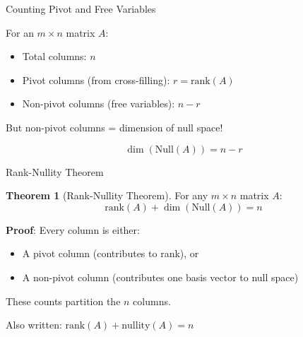 \documentclass[10pt]{beamer}
\theoremstyle{definition}
\newtheorem{thm}{Theorem}[section]
\newcommand{\x}[1]{\alert{\textbf{#1}}}
\begin{document}
\begin{frame}{Counting Pivot and Free Variables}

For an $m \times n$ matrix $A$:

\vspace{1em}

\begin{itemize}
\item Total columns: $n$
\item Pivot columns (from cross-filling): $r = \text{rank}(A)$
\item Non-pivot columns (free variables): $n - r$
\end{itemize}

\vspace{1em}

But non-pivot columns = dimension of null space!

\vspace{1em}

$$\dim(\text{Null}(A)) = n - r$$

\end{frame}

\begin{frame}{Rank-Nullity Theorem}

\begin{thm}[Rank-Nullity Theorem]
For any $m \times n$ matrix $A$:
$$\boxed{\text{rank}(A) + \dim(\text{Null}(A)) = n}$$
\end{thm}

\vspace{1em}

\x{Proof}: Every column is either:
\begin{itemize}
\item A pivot column (contributes to rank), or
\item A non-pivot column (contributes one basis vector to null space)
\end{itemize}

These counts partition the $n$ columns.

\vspace{1em}

Also written: $\text{rank}(A) + \text{nullity}(A) = n$

\end{frame}
\end{document}
